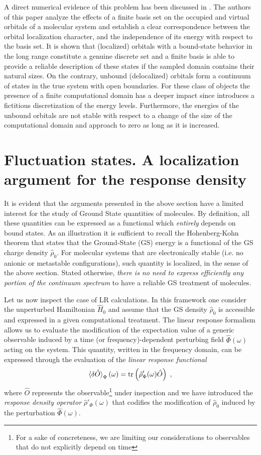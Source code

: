 \documentclass[reprint,aps,prb]{revtex4-1}
\newcommand{\be}{\begin{equation}}
\newcommand{\ee}{\end{equation}}
\newcommand{\lb}{\label}
\newcommand{\op}[1]{\hat {#1}}
\newcommand{\trace}[1]{\mathrm{tr}\left(#1\right)}
\newcommand{\dmnot}{\op{\rho}_0}
\newcommand{\dm}{\op{\rho}}
\newcommand{\hnot}{\op{H}_0}
\begin{document}
A direct numerical evidence of this problem has been discussed in \cite{boffi2016}. The authors of this paper analyze the effects of a finite basis set on the 
occupied and virtual orbitals of a molecular system and establish a clear correspondence between the orbital localization character, 
and the independence of its energy with respect to the basis set. It is shown that (localized) orbitals with a bound-state behavior in the long range constitute a genuine discrete set and a finite basis is 
able to provide a reliable description of these states if the sampled domain contains their natural sizes. On the contrary, unbound (delocalized) orbitals form a continuum of states in the 
true system with open boundaries. For these class of objects the presence of a finite computational domain has a deeper impact since introduces a fictitious discretization of the energy levels. 
Furthermore, the energies of the unbound orbitals are not stable with respect to a change of the size of the computational domain and approach to zero as long as it is increased.  


\section{Fluctuation states. A localization argument for the response density}
It is evident that the arguments presented in the above section have a limited interest for the study
of Ground State quantities of molecules. By definition, all these quantities can be expressed as a 
functional which \emph{entirely} depends on bound states. As an illustration it is sufficient to recall
the Hohenberg-Kohn theorem that states that the Ground-State (GS) energy is a functional of the GS
charge density $\dmnot$. For molecular systems that are electronically stable (i.e. no anionic or metastable configurations),
such quantity is localized, in the sense of the above section. Stated otherwise, 
\emph{there is no need to express efficiently any portion of the continuum spectrum} to have a reliable GS treatment of molecules.

Let us now inspect the case of LR calculations.
In this framework one consider the unperturbed Hamiltonian $\hnot$ and assume that 
the GS density $\dmnot$ is accessible and expressed in a given computational treatment. 
The linear response formalism allows us to evaluate the modification of the expectation value of a generic observable induced by a 
time (or frequency)-dependent perturbing field $\op\Phi(\omega)$ acting on the system. 
This quantity, written in the frequency domain, can be expressed through the evaluation of the \emph{linear response functional}
\be\lb{LinearResponseFunctDef1}
\braket{\delta\op O}_\Phi(\omega) = \trace{\dm'_\Phi(\omega)\op O} \;,
\ee
where $\op O$ represents the observable\footnote{For a sake of concreteness, we are limiting our considerations to observables that do not explicitly depend on time} under inspection 
and we have introduced the \emph{response density operator} $\dm'_\Phi(\omega)$ that codifies the modification of $\dmnot$ induced by the perturbation $\op\Phi(\omega)$. 
\end{document}
